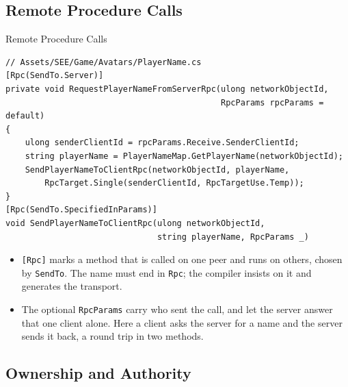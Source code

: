\subsection{Remote Procedure Calls}

\begin{frame}[fragile]{Remote Procedure Calls}
  \begin{lstlisting}[basicstyle=\scriptsize\ttfamily]
// Assets/SEE/Game/Avatars/PlayerName.cs
[Rpc(SendTo.Server)]
private void RequestPlayerNameFromServerRpc(ulong networkObjectId,
                                            RpcParams rpcParams = default)
{
    ulong senderClientId = rpcParams.Receive.SenderClientId;
    string playerName = PlayerNameMap.GetPlayerName(networkObjectId);
    SendPlayerNameToClientRpc(networkObjectId, playerName,
        RpcTarget.Single(senderClientId, RpcTargetUse.Temp));
}
[Rpc(SendTo.SpecifiedInParams)]
void SendPlayerNameToClientRpc(ulong networkObjectId,
                               string playerName, RpcParams _)
  \end{lstlisting}
  \vspace{0.5ex}

  \begin{itemize}
    \item \texttt{[Rpc]} marks a method that is called on one peer and runs on
      others, chosen by \texttt{SendTo}. The name must end in \texttt{Rpc}; the
      compiler insists on it and generates the transport.
    \item The optional \texttt{RpcParams} carry who sent the call, and let the
      server answer that one client alone. Here a client asks the server for a
      name and the server sends it back, a round trip in two methods.
  \end{itemize}
\end{frame}

\subsection{Ownership and Authority}

